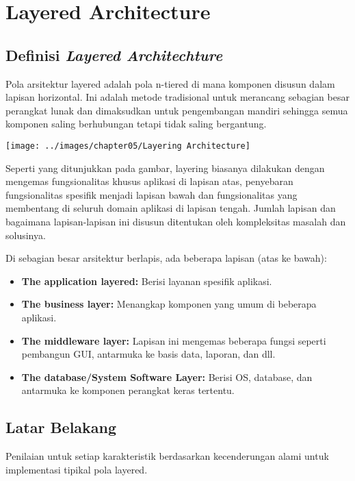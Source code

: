 \chapter{Layered Architecture}

\section{Definisi \textit{Layered Architechture}}

Pola arsitektur layered adalah pola n-tiered di mana komponen disusun dalam lapisan horizontal. Ini adalah metode tradisional untuk merancang sebagian besar perangkat lunak dan dimaksudkan untuk pengembangan mandiri sehingga semua komponen saling berhubungan tetapi tidak saling bergantung.

\texttt{[image: ../images/chapter05/Layering Architecture]}

Seperti yang ditunjukkan pada gambar, layering biasanya dilakukan dengan mengemas fungsionalitas khusus aplikasi di lapisan atas, penyebaran fungsionalitas spesifik menjadi lapisan bawah dan fungsionalitas yang membentang di seluruh domain aplikasi di lapisan tengah. Jumlah lapisan dan bagaimana lapisan-lapisan ini disusun ditentukan oleh kompleksitas masalah dan solusinya.

Di sebagian besar arsitektur berlapis, ada beberapa lapisan (atas ke bawah):

\begin{itemize}
    \item \textbf{The application layered:} Berisi layanan spesifik aplikasi.
    \item \textbf{The business layer:} Menangkap komponen yang umum di beberapa aplikasi.
    \item \textbf{The middleware layer:} Lapisan ini mengemas beberapa fungsi seperti pembangun GUI, antarmuka ke basis data, laporan, dan dll.
    \item \textbf{The database/System Software Layer:} Berisi OS, database, dan antarmuka ke komponen perangkat keras tertentu.
\end{itemize}

\section{Latar Belakang}

Penilaian untuk setiap karakteristik berdasarkan kecenderungan alami untuk implementasi tipikal pola layered.

